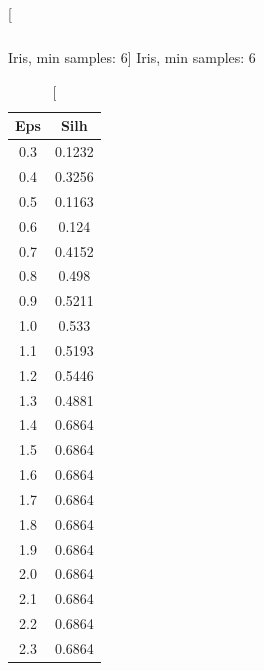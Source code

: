 \documentclass{classrep}
\begin{document}
{{{\begin{table}[!htbp]
\begin{minipage}{.24\textwidth}
\begin{tabular}{|c|c|}
                        \end{tabular}
                        \caption
                        [Iris, min samples: 6]
                        {Iris, min samples: 6}
                        \label{db_scan_table_Iris_manh_min_sample6}
                    \end{minipage}
                    \hfill
                    \begin{minipage}{.24\textwidth}
                        \centering
                        \begin{tabular}{|c|c|}
                            \hline
                            Eps & Silh \\ \hline
                            0.3 & 0.1232 \\ \hline
                            0.4 & 0.3256 \\ \hline
                            0.5 & 0.1163 \\ \hline
                            0.6 & 0.124 \\ \hline
                            0.7 & 0.4152 \\ \hline
                            0.8 & 0.498 \\ \hline
                            0.9 & 0.5211 \\ \hline
                            1.0 & 0.533 \\ \hline
                            1.1 & 0.5193 \\ \hline
                            1.2 & 0.5446 \\ \hline
                            1.3 & 0.4881 \\ \hline
                            1.4 & 0.6864 \\ \hline
                            1.5 & 0.6864 \\ \hline
                            1.6 & 0.6864 \\ \hline
                            1.7 & 0.6864 \\ \hline
                            1.8 & 0.6864 \\ \hline
                            1.9 & 0.6864 \\ \hline
                            2.0 & 0.6864 \\ \hline
                            2.1 & 0.6864 \\ \hline
                            2.2 & 0.6864 \\ \hline
                            2.3 & 0.6864 \\ \hline

\end{tabular}
\end{minipage}
\end{table}}}}
\end{document}
